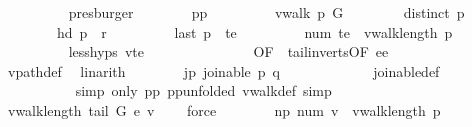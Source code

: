 \begin{isabellebody}
\ \ \ \ \ \ \ \ \isamarkupfalse%
\ presburger\isanewline
\ \ \ \ \ \ \isamarkupfalse%
\ pp{\isacharprime}{\isacharcolon}\ \isanewline
\ \ \ \ \ \ \ \ {\isachardoublequoteopen}vwalk\ {\isacharquery}p{\isacharprime}\ G{\isachardoublequoteclose}\isanewline
\ \ \ \ \ \ \ \ {\isachardoublequoteopen}distinct\ {\isacharquery}p{\isacharprime}{\isachardoublequoteclose}\ \isanewline
\ \ \ \ \ \ \ \ {\isachardoublequoteopen}hd\ {\isacharquery}p{\isacharprime}\ {\isacharequal}\ r{\isachardoublequoteclose}\ \isanewline
\ \ \ \ \ \ \ \ {\isachardoublequoteopen}last\ {\isacharquery}p{\isacharprime}\ {\isacharequal}\ {\isacharquery}te{\isachardoublequoteclose}\ \isanewline
\ \ \ \ \ \ \ \ {\isachardoublequoteopen}num\ {\isacharquery}te\ {\isacharequal}\ vwalk{\isacharunderscore}length\ {\isacharquery}p{\isacharprime}{\isachardoublequoteclose}\ \isanewline
\ \ \ \ \ \ \ \ \isamarkupfalse%
\ less{\isachardot}hyps{\isacharbrackleft}\ v{\isacharequal}{\isachardoublequoteopen}{\isacharquery}te{\isachardoublequoteclose}{\isacharcomma}\ \isanewline
\ \ \ \ \ \ \ \ \ \ \ \ \ \ OF\ {\isacharunderscore}\ tail{\isacharunderscore}in{\isacharunderscore}verts{\isacharbrackleft}OF\ ee{\isacharparenleft}{}{\isacharparenright}{\isacharbrackright}{\isacharbrackright}\ \isanewline
\ \ \ \ \ \ \ \ \isamarkupfalse%
\ vpath{\isacharunderscore}def\ \isamarkupfalse%
\ linarith{\isacharplus}\isanewline
\ \ \ \ \ \ \isamarkupfalse%
\ jp{\isacharcolon}\ {\isachardoublequoteopen}joinable\ {\isacharquery}p{\isacharprime}\ {\isacharquery}q{\isachardoublequoteclose}\ \isanewline
\ \ \ \ \ \ \ \ \ \isamarkupfalse%
\ \ joinable{\isacharunderscore}def\ \isanewline
\ \ \ \ \ \ \ \ \ \isamarkupfalse%
\ {\isacharparenleft}simp\ only{\isacharcolon}\ pp{\isacharprime}{\isacharparenleft}{}{\isacharparenright}\ pp{\isacharprime}{\isacharparenleft}{}{\isacharparenright}{\isacharbrackleft}unfolded\ vwalk{\isacharunderscore}def{\isacharbrackright}{\isacharcomma}\ simp{\isacharparenright}\isanewline
\ \ \ \ \ \ \isamarkupfalse%
\ {\isachardoublequoteopen}vwalk{\isacharunderscore}length\ {\isacharbrackleft}tail\ G\ e{\isacharcomma}\ v{\isacharbrackright}\ {\isacharequal}\ {}{\isachardoublequoteclose}\ \isamarkupfalse%
\ force\isanewline
\ \ \ \ \ \ \isamarkupfalse%
\ np{\isacharcolon}\ {\isachardoublequoteopen}num\ v\ {\isacharequal}\ vwalk{\isacharunderscore}length\ p{\isachardoublequoteclose}\ \isanewline

\end{isabellebody}
